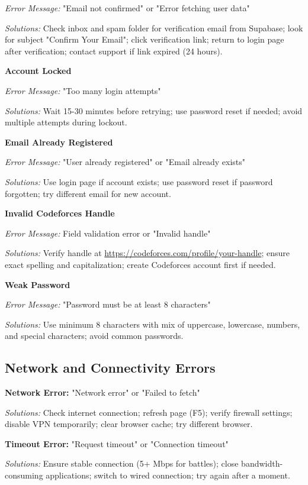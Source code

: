 \documentclass[12pt,a4paper]{article}
\begin{document}
\textit{Error Message:} "Email not confirmed" or "Error fetching user data"

\textit{Solutions:} Check inbox and spam folder for verification email from Supabase; look for subject "Confirm Your Email"; click verification link; return to login page after verification; contact support if link expired (24 hours).

\textbf{Account Locked}

\textit{Error Message:} "Too many login attempts"

\textit{Solutions:} Wait 15-30 minutes before retrying; use password reset if needed; avoid multiple attempts during lockout.

\textbf{Email Already Registered}

\textit{Error Message:} "User already registered" or "Email already exists"

\textit{Solutions:} Use login page if account exists; use password reset if password forgotten; try different email for new account.

\textbf{Invalid Codeforces Handle}

\textit{Error Message:} Field validation error or "Invalid handle"

\textit{Solutions:} Verify handle at \url{https://codeforces.com/profile/your-handle}; ensure exact spelling and capitalization; create Codeforces account first if needed.

\textbf{Weak Password}

\textit{Error Message:} "Password must be at least 8 characters"

\textit{Solutions:} Use minimum 8 characters with mix of uppercase, lowercase, numbers, and special characters; avoid common passwords.

\subsection{Network and Connectivity Errors}

\textbf{Network Error:} "Network error" or "Failed to fetch"

\textit{Solutions:} Check internet connection; refresh page (F5); verify firewall settings; disable VPN temporarily; clear browser cache; try different browser.

\textbf{Timeout Error:} "Request timeout" or "Connection timeout"

\textit{Solutions:} Ensure stable connection (5+ Mbps for battles); close bandwidth-consuming applications; switch to wired connection; try again after a moment.
\end{document}
